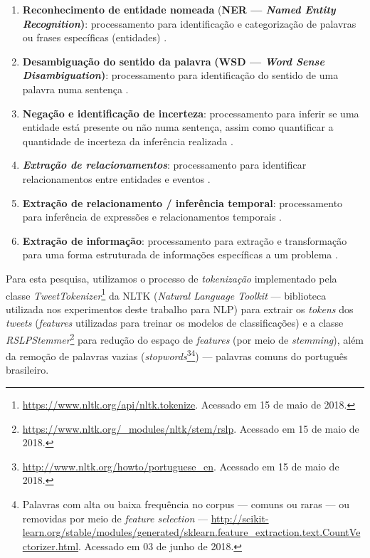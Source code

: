 \documentclass[
	12pt,				%
	oneside,			%
	a4paper,			%
	english,			%
	brazil				%
	]{abntex2ppgsi}
\begin{document}
{\begin{enumerate}
\begin{enumerate}
\item{}\textbf{Reconhecimento de entidade nomeada} {(\textbf{NER --- \textit{Named Entity Recognition})}:} processamento para identificação e categorização de palavras ou frases específicas (entidades) \cite{nadkarni2011natural}.
\item{} {\textbf{Desambiguação do sentido da palavra} \textbf{(WSD --- \textit{Word Sense Disambiguation})}:} processamento para identificação do sentido de uma palavra numa sentença \cite{nadkarni2011natural}. 
\item \textbf{Negação e identificação de incerteza}: processamento para inferir se uma entidade está presente ou não numa sentença, assim como quantificar a quantidade de incerteza da inferência realizada \cite{nadkarni2011natural}.
\item \textbf{\textit{Extração de relacionamentos}}: processamento para identificar relacionamentos entre entidades e eventos \cite{nadkarni2011natural}.
\item \textbf{Extração de relacionamento / inferência temporal}: processamento para inferência de expressões e relacionamentos temporais \cite{nadkarni2011natural}.
\item \textbf{Extração de informação}: processamento para extração e transformação para uma forma estruturada de informações específicas a um problema \cite{nadkarni2011natural}.
\end{enumerate}
\end{enumerate}

Para esta pesquisa, utilizamos o processo de \textit{tokenização} implementado pela classe \textit{TweetTokenizer}\footnote {\url{https://www.nltk.org/api/nltk.tokenize}. Acessado em 15 de maio de 2018.} da NLTK (\textit{Natural Language Toolkit} --- biblioteca utilizada nos experimentos deste trabalho para NLP) para extrair os \textit{tokens} dos \textit{tweets} (\textit{features} utilizadas para treinar os modelos de classificações) e a classe \textit {RSLPStemmer}\footnote{\url{https://www.nltk.org/\_modules/nltk/stem/rslp}. Acessado em 15 de maio de 2018.} para redução do espaço de \textit{features} (por meio de \textit{stemming}), além da remoção de palavras vazias (\textit{stopwords}\footnote{\url{http://www.nltk.org/howto/portuguese\_en}. Acessado em 15 de maio de 2018.}\footnote{Palavras com alta ou baixa frequência no corpus --- comuns ou raras --- ou removidas por meio de \textit{feature selection} --- \url{http://scikit-learn.org/stable/modules/generated/sklearn.feature_extraction.text.CountVectorizer.html}. Acessado em 03 de junho de 2018.}) --- palavras comuns do português brasileiro.

}
\end{document}
